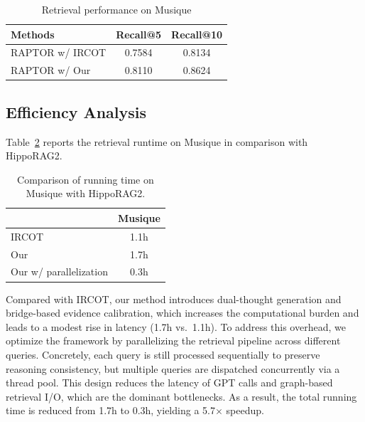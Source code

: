 \documentclass{article} %
\begin{document}
\begin{table}[t]
\centering
\begin{tabular}{lcc}
\toprule
Methods & Recall@5 & Recall@10 \\
\midrule
RAPTOR w/ IRCOT & 0.7584 & 0.8134 \\
RAPTOR w/ Our    & 0.8110 & 0.8624 \\
\end{tabular}
\caption{Retrieval performance on Musique}
\label{tab:recall5}
\end{table}
\subsection{Efficiency Analysis}
\label{sec:efficiency}

Table~\ref{tab:runtime} reports the retrieval runtime on Musique in comparison with HippoRAG2.
\begin{table}
\centering
\begin{tabular}{lc}
\toprule
           & Musique \\
\midrule
IRCOT   & 1.1h    \\
Our  & 1.7h   \\
Our w/ parallelization & 0.3h  \\
\bottomrule
\end{tabular}
\caption{Comparison of running time on Musique with HippoRAG2.}
\label{tab:runtime}
\vspace{-0.1in}
\end{table}
Compared with IRCOT, our method introduces dual-thought generation and bridge-based evidence calibration, which increases the computational burden and leads to a modest rise in latency (1.7h vs.\ 1.1h). 
To address this overhead, we optimize the framework by parallelizing the retrieval pipeline across different queries. 
Concretely, each query is still processed sequentially to preserve reasoning consistency, but multiple queries are dispatched concurrently via a thread pool. 
This design reduces the latency of GPT calls and graph-based retrieval I/O, which are the dominant bottlenecks. 
As a result, the total running time is reduced from 1.7h to 0.3h, yielding a 5.7$\times$ speedup.
\end{document}
